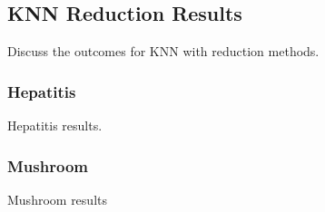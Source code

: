 \subsection{KNN Reduction Results}
Discuss the outcomes for KNN with reduction methods.

\subsubsection{Hepatitis}
Hepatitis results.

\subsubsection{Mushroom}
Mushroom results